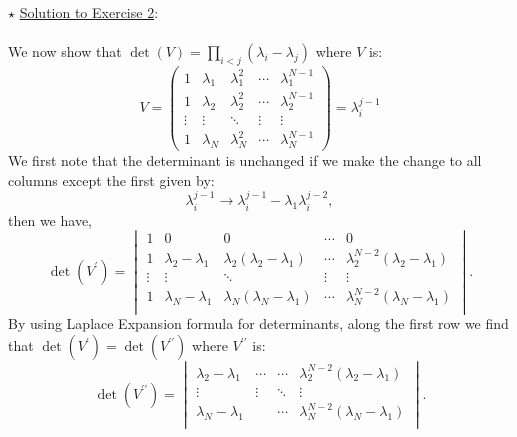 \documentclass[letter,11pt]{article}
\begin{document}
\noindent $\star$ \ul{Solution to Exercise 2}:
\\ \\ 
We now show that $\det(V) = \prod_{i<j} (\lambda_i - \lambda_j)$ where $V$ is: 
\begin{equation*}
	V = 
	\begin{pmatrix}
		1 & \lambda_1 & \lambda_{1}^{2} & \cdots & \lambda_{1}^{N-1} \\
		1 & \lambda_2 & \lambda_{2}^{2} & \cdots & \lambda_{2}^{N-1} \\ 
		\vdots  & \vdots  & \ddots & \vdots & \vdots \\
		1 & \lambda_N & \lambda_{N}^{2} & \cdots & \lambda_{N}^{N-1} 
	\end{pmatrix} = \lambda_{i}^{j-1} 
\end{equation*}
We first note that the determinant is unchanged
if we make the change to all columns except the first given by:
\begin{equation}
	\lambda_{i}^{j-1} \to \lambda_{i}^{j-1} - \lambda_{1} \lambda_{i}^{j-2},
\end{equation}
then we have, 
\begin{equation}
	\det(V^{\prime}) = 
	\begin{vmatrix}
		1 & 0 & 0 & \cdots & 0 \\
		1 & \lambda_2 - \lambda_1 & \lambda_2(\lambda_2 - \lambda_1) & \cdots & \lambda_2^{N-2}(\lambda_2 - \lambda_1) \\ 
		\vdots  & \vdots  & \ddots & \vdots & \vdots  \\
		1 & \lambda_N - \lambda_1 & \lambda_N(\lambda_N - \lambda_1) & \cdots & \lambda_N^{N-2}(\lambda_N - \lambda_1) \\
	\end{vmatrix}.
\end{equation}
By using Laplace Expansion formula for determinants, along the first row we find that $\det(V^{\prime}) = \det(V^{\prime\prime})$ where $V^{\prime\prime}$ is:
\begin{equation}
	\det(V^{\prime\prime}) = 
	\begin{vmatrix}
		 \lambda_2 - \lambda_1 & \cdots & \cdots & \lambda_2^{N-2}(\lambda_2 - \lambda_1) \\ 
		\vdots  & \vdots  & \ddots & \vdots  \\
		\lambda_N - \lambda_1 &  & \cdots &  \lambda_N^{N-2}(\lambda_N - \lambda_1) \\
	\end{vmatrix}.
\end{equation}
\end{document}
